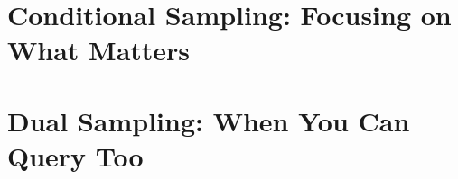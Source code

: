 \section{Conditional Sampling: Focusing on What Matters}
\section{Dual Sampling: When You Can Query Too}
